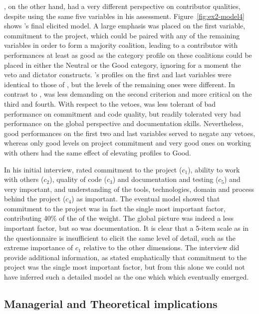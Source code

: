 \DB, on the other hand, had a very different perspective on contributor qualities, despite using the same five variables in his assessment. 
Figure~\ref{fig:ex2-model4} shows \DB's final elicited model. 
A large emphasis was placed on the first variable, commitment to the project, which could be paired with any of the remaining variables in order to form a majority coalition, leading to a contributor with performances at least as good as the category profile on these coalitions could be placed in either the Neutral or the Good category, ignoring for a moment the veto and dictator constructs. \DB's profiles on the first and last variables were identical to those of \GJ, but the levels of the remaining ones were different. In contrast to \GJ, \DB was less demanding on the second criterion and more critical on the third and fourth. With respect to the vetoes, \DB was less tolerant of bad performance on commitment and code quality, but readily tolerated very bad performance on the global perspective and documentation skills. Nevertheless, good performances on the first two and last variables served to negate any vetoes, whereas only good levels on project commitment and very good ones on working with others had the same effect of elevating profiles to Good.

In his initial interview, \DB rated commitment to the project ($c_1$), ability to work with others ($c_2$), quality of code ($c_3$) and documentation and testing ($c_5$) and very important, and understanding of the tools, technologies, domain and process behind the project ($c_4$) as important. The eventual model showed that commitment to the project was in fact the single most important factor, contributing 40\% of the of the weight. The global picture was indeed a less important factor, but so was documentation. It is clear that a 5-item scale as in the questionnaire is insufficient to elicit the same level of detail, such as the extreme importance of $c_1$ relative to the other dimensions. The interview did provide additional information, as \DB stated emphatically that commitment to the project was the single most important factor, but from this alone we could not have inferred such a detailed model as the one which which eventually emerged.

\subsection{Managerial and Theoretical implications}
\label{subsec:managerialimplic}

